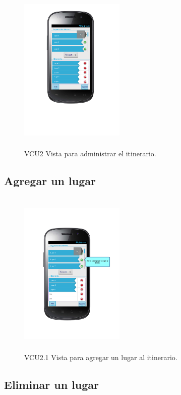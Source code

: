 \begin{figure}[h]
  \centering
    \includegraphics[width=5cm,height=8cm]{Imagenes/VistasSistema/CU2.png}
  \caption{VCU2 Vista para administrar el itinerario.}  
\end{figure}

\newpage
\subsection{Agregar un lugar}

\begin{figure}[h]
  \centering
    \includegraphics[width=5cm,height=8cm]{Imagenes/VistasSistema/CU2_1.png}
  \caption{VCU2.1 Vista para agregar un lugar al itinerario.}  
\end{figure}

\newpage
\subsection{Eliminar un lugar}

